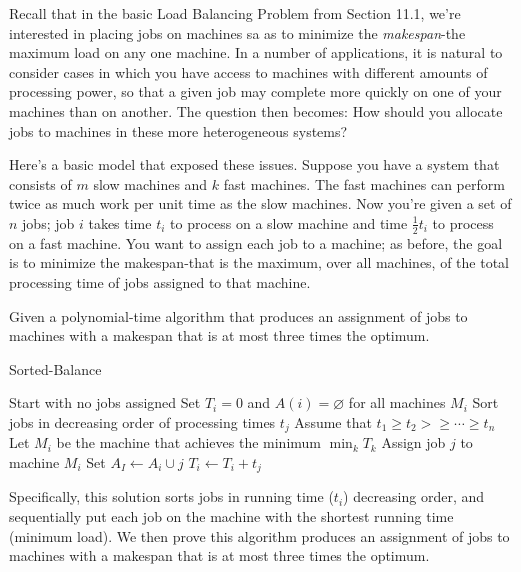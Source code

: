   \begin{problem}
    Recall that in the basic Load Balancing Problem from Section 11.1, we're interested in placing jobs on machines sa as to minimize the \emph{makespan}-the maximum load on any one machine. In a number of applications, it is natural to consider cases in which you have access to machines with different amounts of processing power, so that a given job may complete more quickly on one of your machines than on another. The question then becomes: How should you allocate jobs to machines in these more heterogeneous systems?
    
    Here's a basic model that exposed these issues. Suppose you have a system that consists of $m$ slow machines and $k$ fast machines. The fast machines can perform twice as much work per unit time as the slow machines. Now you're given a set of $n$ jobs; job $i$ takes time $t_i$ to process on a slow machine and time $\frac{1}{2}t_i$ to process on a fast machine. You want to assign each job to a machine; as before, the goal is to minimize the makespan-that is the maximum, over all machines, of the total processing time of jobs assigned to that machine.
    
    Given a polynomial-time algorithm that produces an assignment of jobs to machines with a makespan that is at most three times the optimum.
    
    \Answer
    \begin{algorithm}[H]
      \caption{Sorted-Balance}\label{alg1}
      \begin{small}
        \begin{algorithmic}[1]
          \State Start with no jobs assigned
          \State Set $T_i = 0$ and $A(i)=\varnothing$ for all machines $M_i$
          \State Sort jobs in decreasing order of processing times $t_j$
          \State Assume that $ t_1\geq t_2 >\geq \cdots \geq t_n$
           \label{alg2:lin5}
          \State Let $M_i$ be the machine that achieves the minimum $\min_k T_k$
          \State Assign job $j$ to machine $M_i$
          \State Set $A_{I}\leftarrow A_{i}\cup{j}$
          \State $T_i\leftarrow T_i +t_j$
          \EndFor
        \end{algorithmic}
      \end{small}
    \end{algorithm}
    
    Specifically, this solution sorts jobs in running time ($t_i$) decreasing order, and sequentially put each job on the machine with the shortest running time (minimum load). We then prove this algorithm produces an assignment of jobs to machines with a makespan that is at most three times the optimum.
    

\end{problem}
